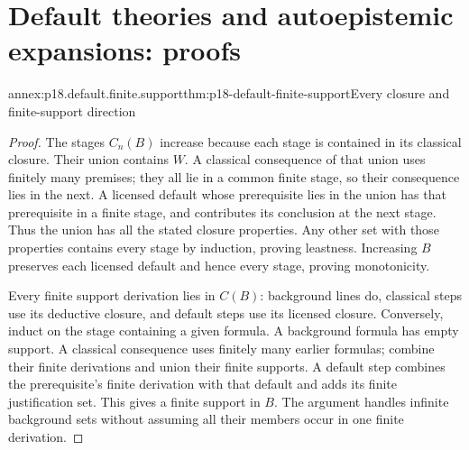\section{Default theories and autoepistemic expansions: proofs}
\label{sec:annex-p18-default-autoepistemic}

\begin{annexitem}{annex:p18.default.finite.support}{thm:p18-default-finite-support}{Every closure and finite-support direction}
\begin{proof}
The stages \(C_n(B)\) increase because each stage is
contained in its classical closure. Their union contains
\(W\). A classical consequence of that union uses
finitely many premises; they all lie in a common
finite stage, so their consequence lies in the next.
A licensed default whose prerequisite lies in the
union has that prerequisite in a finite stage,
and contributes its conclusion at the next stage.
Thus the union has all the stated closure properties.
Any other set with those properties contains every
stage by induction, proving leastness. Increasing
\(B\) preserves each licensed default and hence
every stage, proving monotonicity.

Every finite support derivation lies in \(C(B)\):
background lines do, classical steps use its
deductive closure, and default steps use its
licensed closure. Conversely, induct on the
stage containing a given formula. A background
formula has empty support. A classical
consequence uses finitely many earlier formulas;
combine their finite derivations and union
their finite supports. A default step combines
the prerequisite's finite derivation with that
default and adds its finite justification set.
This gives a finite support in \(B\).
The argument handles infinite background sets
without assuming all their members occur in
one finite derivation.
\end{proof}
\end{annexitem}

